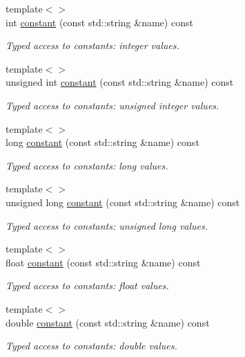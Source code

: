 \begin{DoxyCompactItemize}
$${\footnotesize template$<$$>$ }\\int \hyperlink{class_d_d4hep_1_1_geometry_1_1_l_c_d_d_a0203983a09a1a7d584f05ed000dc9f6f}{constant} (const std\+::string \&name) const
\begin{DoxyCompactList}\small\item\em Typed access to constants\+: integer values. \end{DoxyCompactList}\item 
{\footnotesize template$<$$>$ }\\unsigned int \hyperlink{class_d_d4hep_1_1_geometry_1_1_l_c_d_d_a8ec97cc23881278c36d348ca958a04e1}{constant} (const std\+::string \&name) const
\begin{DoxyCompactList}\small\item\em Typed access to constants\+: unsigned integer values. \end{DoxyCompactList}\item 
{\footnotesize template$<$$>$ }\\long \hyperlink{class_d_d4hep_1_1_geometry_1_1_l_c_d_d_a0bd4cd1010d95ee73189b412eae4686e}{constant} (const std\+::string \&name) const
\begin{DoxyCompactList}\small\item\em Typed access to constants\+: long values. \end{DoxyCompactList}\item 
{\footnotesize template$<$$>$ }\\unsigned long \hyperlink{class_d_d4hep_1_1_geometry_1_1_l_c_d_d_ae820de852370d3cda2dc649e50257da8}{constant} (const std\+::string \&name) const
\begin{DoxyCompactList}\small\item\em Typed access to constants\+: unsigned long values. \end{DoxyCompactList}\item 
{\footnotesize template$<$$>$ }\\float \hyperlink{class_d_d4hep_1_1_geometry_1_1_l_c_d_d_abb713d2747bb86781643a7a61e2aac1b}{constant} (const std\+::string \&name) const
\begin{DoxyCompactList}\small\item\em Typed access to constants\+: float values. \end{DoxyCompactList}\item 
{\footnotesize template$<$$>$ }\\double \hyperlink{class_d_d4hep_1_1_geometry_1_1_l_c_d_d_a0cba20e59cf2775f22264447e29b0d3c}{constant} (const std\+::string \&name) const
\begin{DoxyCompactList}\small\item\em Typed access to constants\+: double values. \end{DoxyCompactList}\end{DoxyCompactItemize}

